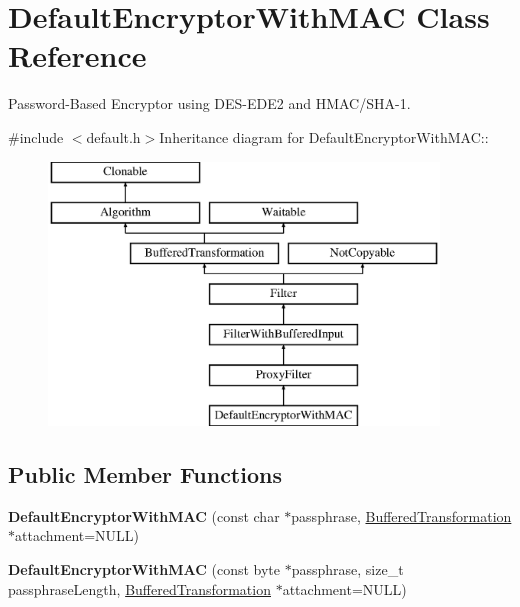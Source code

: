 \hypertarget{class_default_encryptor_with_m_a_c}{
\section{DefaultEncryptorWithMAC Class Reference}
\label{class_default_encryptor_with_m_a_c}
}


Password-\/Based Encryptor using DES-\/EDE2 and HMAC/SHA-\/1.  


{\ttfamily \#include $<$default.h$>$}Inheritance diagram for DefaultEncryptorWithMAC::\begin{figure}[H]
\begin{center}
\leavevmode
\includegraphics[height=7cm]{class_default_encryptor_with_m_a_c}
\end{center}
\end{figure}
\subsection*{Public Member Functions}
\begin{DoxyCompactItemize}
\item 
\hypertarget{class_default_encryptor_with_m_a_c_a50ae737f4a59b5e41db94700a3db8048}{
{\bfseries DefaultEncryptorWithMAC} (const char $\ast$passphrase, \hyperlink{class_buffered_transformation}{BufferedTransformation} $\ast$attachment=NULL)}
\label{class_default_encryptor_with_m_a_c_a50ae737f4a59b5e41db94700a3db8048}

\item 
\hypertarget{class_default_encryptor_with_m_a_c_ac1ec6e244c0ef9a71b9ccfd803db5cf3}{
{\bfseries DefaultEncryptorWithMAC} (const byte $\ast$passphrase, size\_\-t passphraseLength, \hyperlink{class_buffered_transformation}{BufferedTransformation} $\ast$attachment=NULL)}
\label{class_default_encryptor_with_m_a_c_ac1ec6e244c0ef9a71b9ccfd803db5cf3}

\end{DoxyCompactItemize}
